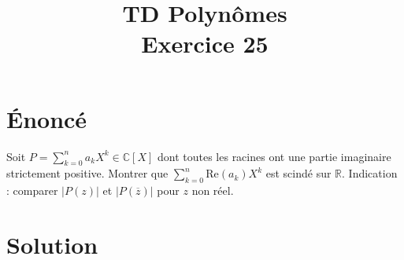 \documentclass[french]{article}
\title{TD Polynômes \\ Exercice 25}
\date{}
\newcommand{\R}{\mathbb{R}}
\newcommand{\C}{\mathbb{C}}
\begin{document}
\maketitle

\section{Énoncé}
Soit $P=\displaystyle\sum_{k=0}^{n}a_kX^k\in\C[X]$ dont toutes les racines ont une partie imaginaire strictement positive. Montrer que $\displaystyle\sum_{k=0}^{n}\text{Re}(a_k)X^k$ est scindé sur $\R$. Indication : comparer $\lvert P(z)\rvert$ et $\lvert P(\overline{z})\rvert$ pour $z$ non réel.
\section{Solution}
\end{document}
